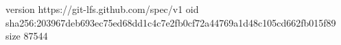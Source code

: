 version https://git-lfs.github.com/spec/v1
oid sha256:203967deb693ec75ed68dd1c4c7e2fb0cf72a44769a1d48c105cd662fb015f89
size 87544
